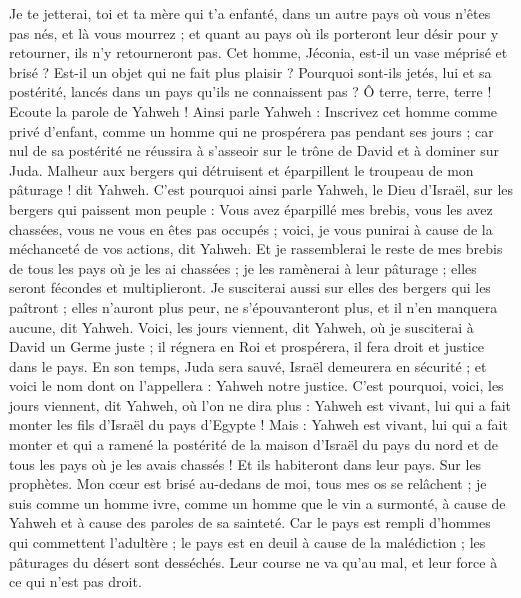 \begin{multicols}{2}
Je te jetterai, toi et ta mère qui t'a enfanté, dans un autre pays où vous n'êtes pas nés, et là vous mourrez ;
et quant au pays où ils porteront leur désir pour y retourner, ils n'y retourneront pas.
Cet homme, Jéconia, est-il un vase méprisé et brisé ? Est-il un objet qui ne fait plus plaisir ? Pourquoi sont-ils jetés, lui et sa postérité, lancés dans un pays qu'ils ne connaissent pas ?
Ô terre, terre, terre ! Ecoute la parole de Yahweh !
Ainsi parle Yahweh : Inscrivez cet homme comme privé d'enfant, comme un homme qui ne prospérera pas pendant ses jours ; car nul de sa postérité ne réussira à s'asseoir sur le trône de David et à dominer sur Juda.
\VerseOne{}Malheur aux bergers qui détruisent et éparpillent le troupeau de mon pâturage ! dit Yahweh.
C'est pourquoi ainsi parle Yahweh, le Dieu d'Israël, sur les bergers qui paissent mon peuple : Vous avez éparpillé mes brebis, vous les avez chassées, vous ne vous en êtes pas occupés ; voici, je vous punirai à cause de la méchanceté de vos actions, dit Yahweh.
Et je rassemblerai le reste de mes brebis de tous les pays où je les ai chassées ; je les ramènerai à leur pâturage ; elles seront fécondes et multiplieront.
Je susciterai aussi sur elles des bergers qui les paîtront ; elles n'auront plus peur, ne s'épouvanteront plus, et il n'en manquera aucune, dit Yahweh.
Voici, les jours viennent, dit Yahweh, où je susciterai à David un Germe juste ; il régnera en Roi et prospérera, il fera droit et justice dans le pays.
En son temps, Juda sera sauvé, Israël demeurera en sécurité ; et voici le nom dont on l'appellera : Yahweh notre justice.
C'est pourquoi, voici, les jours viennent, dit Yahweh, où l'on ne dira plus : Yahweh est vivant, lui qui a fait monter les fils d'Israël du pays d'Egypte !
Mais : Yahweh est vivant, lui qui a fait monter et qui a ramené la postérité de la maison d'Israël du pays du nord et de tous les pays où je les avais chassés ! Et ils habiteront dans leur pays.
Sur les prophètes. Mon cœur est brisé au-dedans de moi, tous mes os se relâchent ; je suis comme un homme ivre, comme un homme que le vin a surmonté, à cause de Yahweh et à cause des paroles de sa sainteté.
Car le pays est rempli d'hommes qui commettent l'adultère ; le pays est en deuil à cause de la malédiction ; les pâturages du désert sont desséchés. Leur course ne va qu'au mal, et leur force à ce qui n'est pas droit.

\end{multicols}
